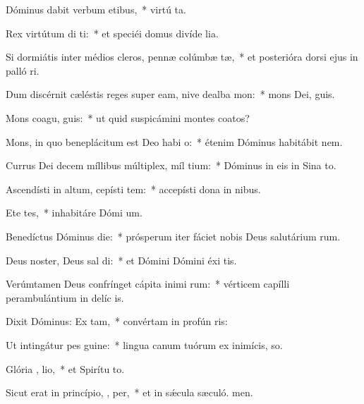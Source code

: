 \item Dóminus dabit verbum etibus,~* virtú ta.
\item Rex virtútum di ti:~* et speciéi domus divíde lia.
\item Si dormiátis inter médios cleros, pennæ colúmbæ tæ,~* et posterióra dorsi ejus in palló ri.
\item Dum discérnit cæléstis reges super eam, nive dealba  mon:~* mons Dei,  guis.
\item Mons coagu,  guis:~* ut quid suspicámini montes coatos?
\item Mons, in quo beneplácitum est Deo habi  o:~* étenim Dóminus habitábit  nem.
\item Currus Dei decem míllibus múltiplex, míl tium:~* Dóminus in eis in Sina  to.
\item Ascendísti in altum, cepísti tem:~* accepísti dona in nibus.
\item Ete  tes,~* inhabitáre Dómi um.
\item Benedíctus Dóminus  die:~* prósperum iter fáciet nobis Deus salutárium rum.
\item Deus noster, Deus sal di:~* et Dómini Dómini éxi tis.
\item Verúmtamen Deus confrínget cápita inimi rum:~* vérticem capílli perambulántium in delíc is.
\item Dixit Dóminus: Ex  tam,~* convértam in profún ris:
\item Ut intingátur pes   guine:~* lingua canum tuórum ex inimícis,  so.
\item Glória ,  lio,~* et Spirítu to.
\item Sicut erat in princípio,  ,  per,~* et in sǽcula sæculó. men.
